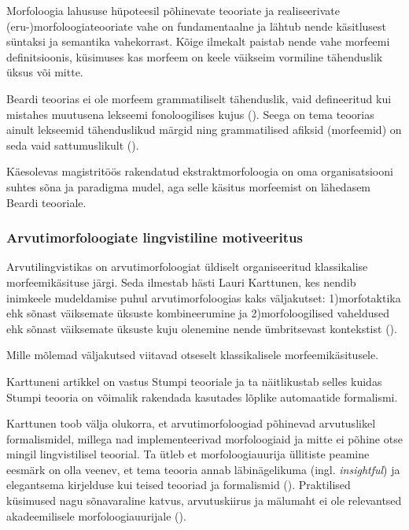 \documentclass[12pt,a4paper]{article}
\begin{document}
Morfoloogia lahususe hüpoteesil põhinevate teooriate ja realiseerivate (eru-)morfoloogia\-teooriate vahe on fundamentaalne ja lähtub nende käsitlusest süntaksi ja semantika vahekorrast. Kõige ilmekalt paistab nende vahe morfeemi definitsioonis, küsimuses kas morfeem on keele väikseim vormiline tähenduslik üksus või mitte.

Beardi teoorias ei ole morfeem grammatiliselt tähenduslik, vaid defineeritud kui mistahes muutusena lekseemi fonoloogilises kujus (\cite[31]{beard_morpheme_1987}). Seega on tema teoorias ainult lekseemid tähenduslikud märgid ning grammatilised afiksid (morfeemid) on seda vaid sattumuslikult (\cite[17]{beard_morpheme_1987}).

Käesolevas magistritöös rakendatud ekstraktmorfoloogia on oma organisatsiooni suhtes sõna ja paradigma mudel, aga selle käsitus morfeemist on lähedasem Beardi teooriale.

\subsubsection{Arvutimorfoloogiate lingvistiline motiveeritus}

Arvutilingvistikas on arvutimorfoloogiat üldiselt organiseeritud klassikalise morfeemi\-käsituse järgi. Seda ilmestab hästi 
Lauri Karttunen, kes nendib inimkeele mudeldamise puhul arvutimorfoloogias kaks väljakutset: 1)\nobreakspace morfotaktika ehk sõnast väiksemate üksuste kombineerumine ja 2)\nobreakspace morfoloogilised vaheldused ehk sõnast väiksemate üksuste kuju olenemine nende ümbritsevast kontekstist (\cite{karttunen_computing_2003}).

Mille mõlemad väljakutsed viitavad otseselt klassikalisele morfeemi\-käsitusele.

Karttuneni artikkel on vastus Stumpi teooriale ja ta näitlikustab selles kuidas Stumpi teooria on võimalik rakendada kasutades lõplike automaatide formalismi.

Karttunen toob välja olukorra, et arvuti\-morfoloogiad põhinevad arvutuslikel formalismidel, millega nad implementeerivad morfoloogiaid ja mitte ei põhine otse mingil lingvistilisel teoorial. Ta ütleb et morfoloogia\-uurija üllitiste peamine eesmärk on olla veenev, et tema teooria annab läbinägelikuma (ingl. \textit{insightful}) ja elegantsema kirjelduse kui teised teooriad ja formalismid (\cite[2]{karttunen_computing_2003}). Praktilised küsimused nagu sõnavaraline katvus, arvutus\-kiirus ja mälu\-maht ei ole relevantsed akadeemilisele morfoloogia\-uurijale (\cite[2]{karttunen_computing_2003}).
\end{document}

